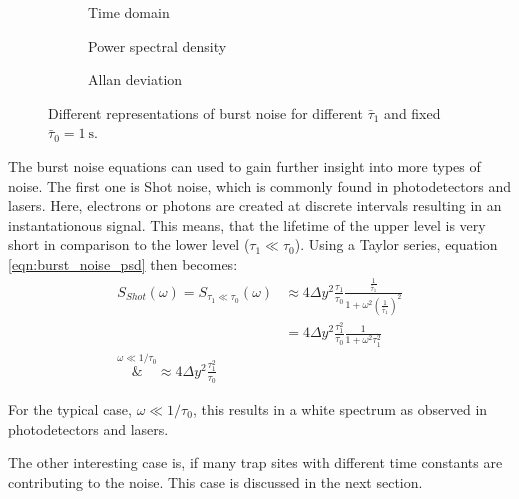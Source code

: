 \begin{figure}[ht]
    \centering
    \begin{subfigure}{0.9\linewidth}
        \centering
        \scalebox{1}{%
            
        } %
        \caption{Time domain}
        \label{fig:burst_noise_time}
    \end{subfigure}
    \begin{subfigure}{0.8\linewidth}
        \centering
        \scalebox{1}{%
            
        } %
        \caption{Power spectral density}
        \label{fig:burst_noise_psd}
    \end{subfigure}
    \begin{subfigure}{0.8\linewidth}
        \centering
        \scalebox{1}{%
            
        } %
        \caption{Allan deviation}
        \label{fig:burst_noise_adev}
    \end{subfigure}
    \caption{Different representations of burst noise for different $\bar \tau_1$ and fixed $\bar \tau_0 = \qty{1}{\s}$.}
    \label{fig:burst_noise_simulated}
\end{figure}

The burst noise equations can used to gain further insight into more types of noise. The first one is Shot noise, which is commonly found in photodetectors and lasers. Here, electrons or photons are created at discrete intervals resulting in an instantationous signal. This means, that the lifetime of the upper level is very short in comparison to the lower level ($\tau_1 \ll \tau_0$). Using a Taylor series, equation \ref{eqn:burst_noise_psd} then becomes:
\begin{align}
    S_{Shot}(\omega) = S_{\tau_1 \ll \tau_0}(\omega) &\approx 4 \Delta y^2 \frac{\tau_1}{\tau_0} \frac{\frac{1}{\bar \tau_1}}{1 + \omega^2 \left(\frac{1}{\bar \tau_1}\right)^2} \nonumber\\
    &= 4 \Delta y^2 \frac{\tau_1^2}{\tau_0} \frac{1}{1+\omega^2\tau_1^2}\\
    \overset{\omega \ll 1/\tau_0}&{\approx} 4 \Delta y^2 \frac{\tau_1^2}{\tau_0}
\end{align}

For the typical case, $\omega \ll 1/\tau_0$, this results in a white spectrum as observed in photodetectors and lasers.

The other interesting case is, if many trap sites with different time constants are contributing to the noise. This case is discussed in the next section.

